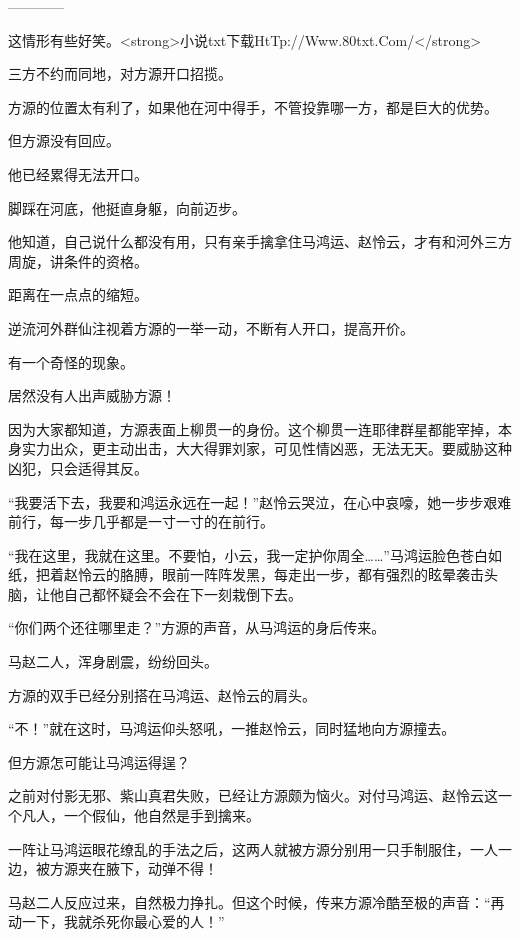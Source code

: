 
\begin{this_body}

------------

这情形有些好笑。<strong>小说txt下载HtTp://Www.80txt.Com/</strong>

三方不约而同地，对方源开口招揽。

方源的位置太有利了，如果他在河中得手，不管投靠哪一方，都是巨大的优势。

但方源没有回应。

他已经累得无法开口。

脚踩在河底，他挺直身躯，向前迈步。

他知道，自己说什么都没有用，只有亲手擒拿住马鸿运、赵怜云，才有和河外三方周旋，讲条件的资格。

距离在一点点的缩短。

逆流河外群仙注视着方源的一举一动，不断有人开口，提高开价。

有一个奇怪的现象。

居然没有人出声威胁方源！

因为大家都知道，方源表面上柳贯一的身份。这个柳贯一连耶律群星都能宰掉，本身实力出众，更主动出击，大大得罪刘家，可见性情凶恶，无法无天。要威胁这种凶犯，只会适得其反。

“我要活下去，我要和鸿运永远在一起！”赵怜云哭泣，在心中哀嚎，她一步步艰难前行，每一步几乎都是一寸一寸的在前行。

“我在这里，我就在这里。不要怕，小云，我一定护你周全……”马鸿运脸色苍白如纸，把着赵怜云的胳膊，眼前一阵阵发黑，每走出一步，都有强烈的眩晕袭击头脑，让他自己都怀疑会不会在下一刻栽倒下去。

“你们两个还往哪里走？”方源的声音，从马鸿运的身后传来。

马赵二人，浑身剧震，纷纷回头。

方源的双手已经分别搭在马鸿运、赵怜云的肩头。

“不！”就在这时，马鸿运仰头怒吼，一推赵怜云，同时猛地向方源撞去。

但方源怎可能让马鸿运得逞？

之前对付影无邪、紫山真君失败，已经让方源颇为恼火。对付马鸿运、赵怜云这一个凡人，一个假仙，他自然是手到擒来。

一阵让马鸿运眼花缭乱的手法之后，这两人就被方源分别用一只手制服住，一人一边，被方源夹在腋下，动弹不得！

马赵二人反应过来，自然极力挣扎。但这个时候，传来方源冷酷至极的声音：“再动一下，我就杀死你最心爱的人！”


\end{this_body}
